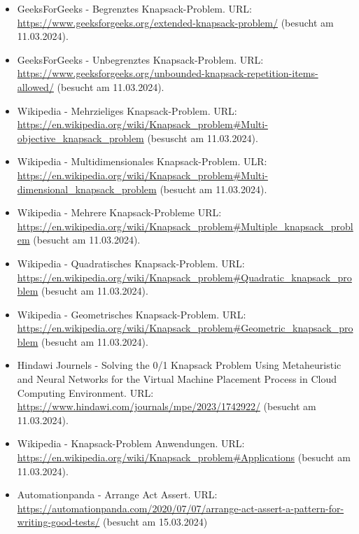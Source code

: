 \begin{itemize}
    \item GeeksForGeeks - Begrenztes Knapsack-Problem. URL: \url{https://www.geeksforgeeks.org/extended-knapsack-problem/} (besucht am 11.03.2024).
    \item GeeksForGeeks - Unbegrenztes Knapsack-Problem. URL: \url{https://www.geeksforgeeks.org/unbounded-knapsack-repetition-items-allowed/} (besucht am 11.03.2024).
    \item Wikipedia - Mehrzieliges Knapsack-Problem. URL: \url{https://en.wikipedia.org/wiki/Knapsack_problem#Multi-objective_knapsack_problem} (besuscht am 11.03.2024).
    \item Wikipedia - Multidimensionales Knapsack-Problem. ULR: \url{https://en.wikipedia.org/wiki/Knapsack_problem#Multi-dimensional_knapsack_problem} (besucht am 11.03.2024).
    \item Wikipedia - Mehrere Knapsack-Probleme URL: \url{https://en.wikipedia.org/wiki/Knapsack_problem#Multiple_knapsack_problem} (besucht am 11.03.2024).
    \item Wikipedia - Quadratisches Knapsack-Problem. URL: \url{https://en.wikipedia.org/wiki/Knapsack_problem#Quadratic_knapsack_problem} (besucht am 11.03.2024).
    \item Wikipedia - Geometrisches Knapsack-Problem. URL: \url{https://en.wikipedia.org/wiki/Knapsack_problem#Geometric_knapsack_problem} (besucht am 11.03.2024).
    \item Hindawi Journels - Solving the 0/1 Knapsack Problem Using Metaheuristic and Neural Networks for the Virtual Machine Placement Process in Cloud Computing Environment. URL: \url{https://www.hindawi.com/journals/mpe/2023/1742922/} (besucht am 11.03.2024).
    \item Wikipedia - Knapsack-Problem Anwendungen. URL: \url{https://en.wikipedia.org/wiki/Knapsack_problem#Applications} (besucht am 11.03.2024).
    \item Automationpanda - Arrange Act Assert. URL: \url{https://automationpanda.com/2020/07/07/arrange-act-assert-a-pattern-for-writing-good-tests/} (besucht am 15.03.2024)
\end{itemize}
